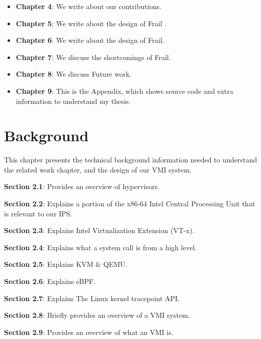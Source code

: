\documentclass{report}
\begin{document}
\begin{spacing}{1.5}
{\begin{itemize}
    \item \textbf{Chapter 4}: We write about our contributions.

    \item \textbf{Chapter 5}: We write about the design of Frail .
    
    \item \textbf{Chapter 6}: We write about the design of  Frail.
        
    \item \textbf{Chapter 7}: We discuss the shortcomings of Frail.
    
    \item \textbf{Chapter 8}: We discuss Future work.

    \item \textbf{Chapter 9}: This is the Appendix, which shows source code and extra information to understand my thesis.
    \leavevmode\newline
\end{itemize}
}






















\chapter{Background}

{\large
This chapter presents the technical background information needed to understand the related work chapter, and the design of our VMI system.
\newline
}


\begin{itemize}
{\large
\item \textbf{Section 2.1}: Provides an overview of hypervisors. 
\item \textbf{Section 2.2}: Explains a portion of the x86-64 Intel Central Processing Unit that is relevant to our IPS. 
\item \textbf{Section 2.3}: Explains Intel Virtualization Extension (VT-x). 
\item \textbf{Section 2.4}: Explains what a system call is from a high level. 
\item \textbf{Section 2.5}: Explains KVM \& QEMU. 
\item \textbf{Section 2.6}: Explains eBPF.
\item \textbf{Section 2.7}: Explains The Linux kernel tracepoint API.
\item \textbf{Section 2.8}: Briefly provides an overview of a VMI system.
\item \textbf{Section 2.9}: Provides an overview of what an VMI is. 
\newline
}
\end{itemize}









\end{spacing}
\end{document}
